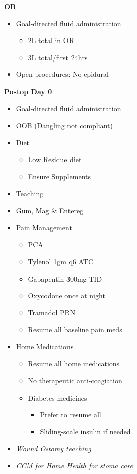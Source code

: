 \documentclass[
]{book}
\providecommand{\tightlist}{%
  \setlength{\itemsep}{0pt}\setlength{\parskip}{0pt}}
\begin{document}
\textbf{OR}

\begin{itemize}
\tightlist
\item
  Goal-directed fluid administration

  \begin{itemize}
  \tightlist
  \item
    2L total in OR
  \item
    3L total/first 24hrs
  \end{itemize}
\item
  Open procedures: No epidural
\end{itemize}

\textbf{Postop Day 0}

\begin{itemize}
\tightlist
\item
  Goal-directed fluid administration
\item
  OOB (Dangling not compliant)
\item
  Diet

  \begin{itemize}
  \tightlist
  \item
    Low Residue diet
  \item
    Ensure Supplements
  \end{itemize}
\item
  Teaching
\item
  Gum, Mag \& Entereg
\item
  Pain Management

  \begin{itemize}
  \tightlist
  \item
    PCA
  \item
    Tylenol 1gm q6 ATC
  \item
    Gabapentin 300mg TID
  \item
    Oxycodone once at night
  \item
    Tramadol PRN
  \item
    Resume all baseline pain meds
  \end{itemize}
\item
  Home Medications

  \begin{itemize}
  \tightlist
  \item
    Resume all home medications
  \item
    No therapeutic anti-coagiation
  \item
    Diabetes medicines

    \begin{itemize}
    \tightlist
    \item
      Prefer to resume all
    \item
      Sliding-scale insulin if needed
    \end{itemize}
  \end{itemize}
\item
  \emph{Wound Ostomy teaching}
\item
  \emph{CCM for Home Health for stoma care}
\end{itemize}
\end{document}
